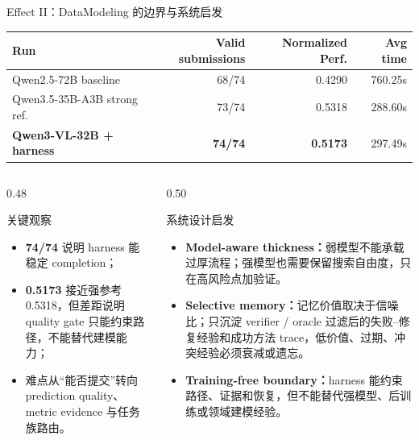 \documentclass[aspectratio=169,UTF8]{ctexbeamer}
\begin{document}
\begin{frame}{Effect II：DataModeling 的边界与系统启发}
\scriptsize
\begin{tabularx}{\textwidth}{p{} r r r}
\toprule
Run & Valid submissions & Normalized Perf. & Avg time \\
\midrule
Qwen2.5-72B baseline & 68/74 & 0.4290 & 760.25s \\
Qwen3.5-35B-A3B strong ref. & 73/74 & 0.5318 & 288.60s \\
\textbf{Qwen3-VL-32B + harness} & \textbf{74/74} & \textbf{0.5173} & 297.49s \\
\bottomrule
\end{tabularx}
\vspace{0.25em}
\begin{columns}[T]
\begin{column}{0.48\textwidth}
\begin{block}{关键观察}
\begin{itemize}
  \item \textbf{74/74} 说明 harness 能稳定 completion；
  \item \textbf{0.5173} 接近强参考 0.5318，但差距说明 quality gate 只能约束路径，不能替代建模能力；
  \item 难点从“能否提交”转向 prediction quality、metric evidence 与任务族路由。
\end{itemize}
\end{block}
\vspace{0.18em}
\begin{center}
\end{center}
\end{column}
\begin{column}{0.50\textwidth}
\begin{block}{系统设计启发}
\begin{itemize}
  \item \textbf{Model-aware thickness：}弱模型不能承载过厚流程；强模型也需要保留搜索自由度，只在高风险点加验证。
  \item \textbf{Selective memory：}记忆价值取决于信噪比；只沉淀 verifier / oracle 过滤后的失败--修复经验和成功方法 trace，低价值、过期、冲突经验必须衰减或遗忘。
  \item \textbf{Training-free boundary：}harness 能约束路径、证据和恢复，但不能替代强模型、后训练或领域建模经验。
\end{itemize}
\end{block}
\end{column}
\end{columns}
\end{frame}
\end{document}
